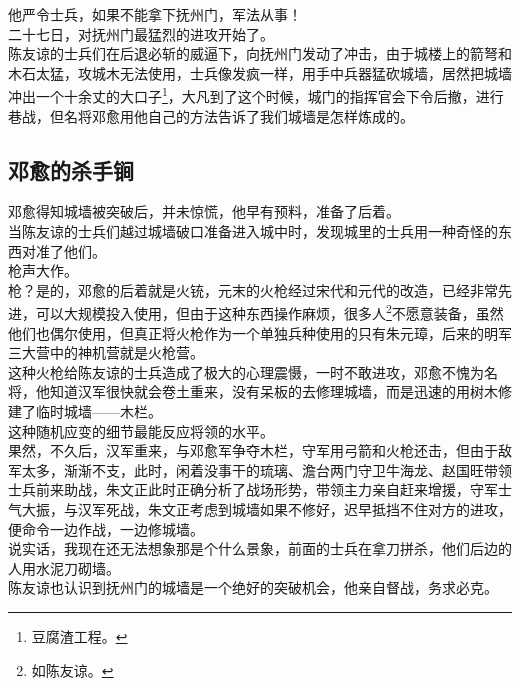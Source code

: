 \begin{multicols}{\theparacolNo}
他严令士兵，如果不能拿下抚州门，军法从事！\\

二十七日，对抚州门最猛烈的进攻开始了。\\

陈友谅的士兵们在后退必斩的威逼下，向抚州门发动了冲击，由于城楼上的箭弩和木石太猛，攻城木无法使用，士兵像发疯一样，用手中兵器猛砍城墙，居然把城墙冲出一个十余丈的大口子\footnote{豆腐渣工程。}，大凡到了这个时候，城门的指挥官会下令后撤，进行巷战，但名将邓愈用他自己的方法告诉了我们城墙是怎样炼成的。\\

\subsection{邓愈的杀手锏}
邓愈得知城墙被突破后，并未惊慌，他早有预料，准备了后着。\\

当陈友谅的士兵们越过城墙破口准备进入城中时，发现城里的士兵用一种奇怪的东西对准了他们。\\

枪声大作。\\

枪？是的，邓愈的后着就是火铳，元末的火枪经过宋代和元代的改造，已经非常先进，可以大规模投入使用，但由于这种东西操作麻烦，很多人\footnote{如陈友谅。}不愿意装备，虽然他们也偶尔使用，但真正将火枪作为一个单独兵种使用的只有朱元璋，后来的明军三大营中的神机营就是火枪营。\\

这种火枪给陈友谅的士兵造成了极大的心理震慑，一时不敢进攻，邓愈不愧为名将，他知道汉军很快就会卷土重来，没有呆板的去修理城墙，而是迅速的用树木修建了临时城墙——木栏。\\

这种随机应变的细节最能反应将领的水平。\\

果然，不久后，汉军重来，与邓愈军争夺木栏，守军用弓箭和火枪还击，但由于敌军太多，渐渐不支，此时，闲着没事干的琉璃、澹台两门守卫牛海龙、赵国旺带领士兵前来助战，朱文正此时正确分析了战场形势，带领主力亲自赶来增援，守军士气大振，与汉军死战，朱文正考虑到城墙如果不修好，迟早抵挡不住对方的进攻，便命令一边作战，一边修城墙。\\

说实话，我现在还无法想象那是个什么景象，前面的士兵在拿刀拼杀，他们后边的人用水泥刀砌墙。\\

陈友谅也认识到抚州门的城墙是一个绝好的突破机会，他亲自督战，务求必克。\\


\end{multicols}
